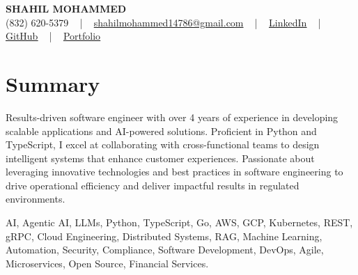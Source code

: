 \documentclass[letterpaper,10pt]{article}
\begin{document}
\begin{center}
    {\fontsize{14pt}{12pt}\selectfont \textbf{\MakeUppercase{Shahil Mohammed}}}\\ \vspace{2pt}
    \fontsize{10pt}{12pt}\selectfont (832) 620-5379 ~ | ~ \href{mailto:shahilmohammed14786@gmail.com}{shahilmohammed14786@gmail.com} ~ | ~  
    \href{https://www.linkedin.com/in/shahil-mohammed-9652931a1/}{\color{blue}\underline{LinkedIn}}  ~ | ~ 
    \href{https://github.com/freakbeast14}{\color{blue}\underline{GitHub}} ~ | ~ 
    \href{https://shahil-mohammed.netlify.app/}{\color{blue}\underline{Portfolio}}
    \vspace{-8pt}
\end{center}

\section{Summary}
\vspace{-2pt}\fontsize{8pt}{9pt}\selectfont
Results-driven software engineer with over 4 years of experience in developing scalable applications and AI-powered solutions. Proficient in Python and TypeScript, I excel at collaborating with cross-functional teams to design intelligent systems that enhance customer experiences. Passionate about leveraging innovative technologies and best practices in software engineering to drive operational efficiency and deliver impactful results in regulated environments.
 \vspace{-5pt}
 
{\fontsize{1pt}{1pt}\selectfont\color{white}
AI, Agentic AI, LLMs, Python, TypeScript, Go, AWS, GCP, Kubernetes, REST, gRPC, Cloud Engineering, Distributed Systems, RAG, Machine Learning, Automation, Security, Compliance, Software Development, DevOps, Agile, Microservices, Open Source, Financial Services.
}
\vspace{-8pt}

\vspace{-2pt}
\end{document}
